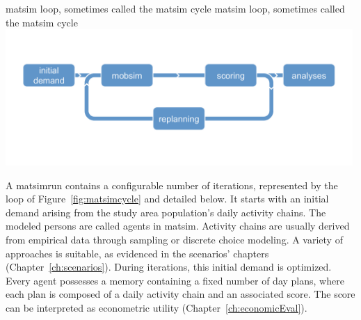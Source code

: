 \createfigure%
{\protect\gls{matsim} loop, sometimes called the \protect\gls{matsim} cycle}%
{\protect\gls{matsim} loop, sometimes called the \protect\gls{matsim} cycle%
}
{\label{fig:matsimcycle}}%
{\includegraphics[width=0.99\textwidth, angle=0]{figures/matsimcycle.pdf}}%
{}

A \gls{matsimrun} contains a configurable number of iterations, represented by the loop of Figure~\ref{fig:matsimcycle} and detailed below. 
%
It starts with an initial demand arising from the \gls{study} area population's daily activity chains. The modeled persons are called agents in \gls{matsim}. Activity chains are usually derived from empirical data through sampling or discrete choice modeling. A variety of approaches is suitable, as evidenced in the scenarios' chapters (Chapter~\ref{ch:scenarios}). During iterations, this initial demand is optimized. Every agent possesses a memory containing a fixed number of day plans, where each \gls{plan} is composed of a daily activity chain and an associated \gls{score}.  The score can be interpreted as econometric utility (\cf Chapter~\ref{ch:economicEval}).


